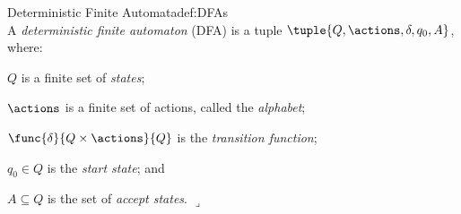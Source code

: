 %


\begin{ncdefine}{Deterministic Finite Automata}{def:DFAs}{\quad\\}
A \emph{deterministic finite automaton} (DFA) is a tuple $\tuple{Q,\actions,\delta,q_0,A}$, where:
\begin{compactitem}
\item
$Q$ is a finite set of \emph{states};
\item
$\actions$ is a finite set of actions, called the \emph{alphabet};
\item
$\func{\delta}{Q \times \actions}{Q}$ is the \emph{transition function};
\item
$q_0 \in Q$ is the \emph{start state}; and
\item
$A \subseteq Q$ is the set of \emph{accept states}.
\hfill\ensuremath{\lrcorner}
\end{compactitem}
\end{ncdefine}


